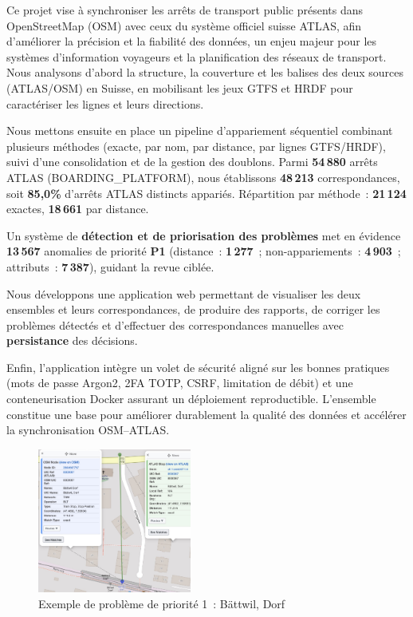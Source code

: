 \begin{spacing}{0.91}
\vspace{-0.55cm}

Ce projet vise à synchroniser les arrêts de transport public présents dans OpenStreetMap (OSM) avec ceux du système officiel suisse ATLAS, afin d’améliorer la précision et la fiabilité des données, un enjeu majeur pour les systèmes d’information voyageurs et la planification des réseaux de transport. Nous analysons d’abord la structure, la couverture et les balises des deux sources (ATLAS/OSM) en Suisse, en mobilisant les jeux GTFS et HRDF pour caractériser les lignes et leurs directions.

Nous mettons ensuite en place un pipeline d’appariement séquentiel combinant plusieurs méthodes (exacte, par nom, par distance, par lignes GTFS/HRDF), suivi d’une consolidation et de la gestion des doublons. Parmi \textbf{54\,880} arrêts ATLAS (BOARDING\_PLATFORM), nous établissons \textbf{48\,213} correspondances, soit \textbf{85,0\%} d’arrêts ATLAS distincts appariés. Répartition par méthode : \textbf{21\,124} exactes, \textbf{18\,661} par distance.

Un système de \textbf{détection et de priorisation des problèmes} met en évidence \textbf{13\,567} anomalies de priorité \textbf{P1} (distance : \textbf{1\,277} ; non-appariements : \textbf{4\,903} ; attributs : \textbf{7\,387}), guidant la revue ciblée.

Nous développons une application web permettant de visualiser les deux ensembles et leurs correspondances, de produire des rapports, de corriger les problèmes détectés et d’effectuer des correspondances manuelles avec \textbf{persistance} des décisions.

Enfin, l'application intègre un volet de sécurité aligné sur les bonnes pratiques (mots de passe Argon2, 2FA TOTP, CSRF, limitation de débit) et une conteneurisation Docker assurant un déploiement reproductible.  L'ensemble constitue une base pour améliorer durablement la qualité des données et accélérer la synchronisation OSM–ATLAS.

\vspace{0.15cm}
\begin{figure}[h]
\centering
\includegraphics[width=0.45\textwidth]{figures/abstract.jpg}
\caption*{Exemple de problème de priorité 1~: Bättwil, Dorf}
\end{figure}
\vspace{0.0cm}


\end{spacing}
